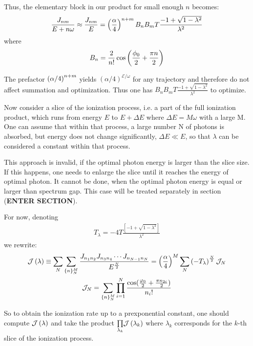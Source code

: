 Thus, the elementary block  in our product for small enough $ n $ becomes:
\begin{gather}
	\frac{J_{nm}}{E+n\omega}
	\approx
	\frac{J_{nm}}{E}
	=
	\left(\frac{\alpha}{4}\right)^{n+m}
	B_n B_m T
	\frac{-1+\sqrt{1-\lambda^2}}{\lambda^2}
\end{gather}
where
\begin{gather}
	B_n=
	\frac{2}{n!}\cos\left(\frac{\phi_0}{2}+\frac{\pi n}{2}\right)
\end{gather}

The prefactor $  \left(\alpha/4\right)^{n+m} $ yields $ (\alpha/4)^{\mathcal{E}/\omega} $ for any trajectory and therefore do not affect summation and optimization. Thus one has $ B_{n}B_{m}T\frac{-1+\sqrt{1-\lambda^{2}}}{\lambda^{2}} $ to optimize.

Now consider a slice of the ionization process, i.e. a part of the full ionization product, which runs from energy $ E $ to $ E+\Delta E $ where $ \Delta E=M\omega $ with a large M. One can assume that within that process, a large number N of photons is absorbed, but energy does not change significantly, $ \Delta E\ll E $, so that $ \lambda $ can be considered a constant within that process. 

This approach is invalid, if the optimal photon energy is larger  than the slice size. If this happens, one needs to enlarge the slice until it reaches the energy of optimal photon. It cannot be done, when the optimal photon energy is equal or larger than spectrum gap. This case will be treated separately in section (\textbf{ENTER SECTION}).

For now, denoting
\begin{gather}
\label{T_lambda_def}
	T_{\lambda}=-4T\frac{\left[-1+\sqrt{1-\lambda^{2}}\right]}{\lambda^{2}}
\end{gather}
we rewrite:
\begin{gather}
\label{ionization_super_formula_sum}
\mathcal{J}\left(\lambda\right)
\equiv
\sum_N
\sum_{\{n\}_{N}^{M}}\frac{	J_{n_1 n_{2}}
	J_{n_3 n_{4}}
	\cdots
	J_{n_{N-1}n_{N}}}{E^{\frac{N}{2}}}
=
\left(\frac{\alpha}{4}\right)^{M}
\sum_N
\left(-T_{\lambda}\right)^{\frac{N}{2}}
\mathcal{J}_N
\\
\label{ionization_super_formula}
\mathcal{J}_N
=
\sum_{\{n\}_{N}^{M}}\prod_{i=1}^{N}\frac{\cos(\frac{\varphi_{0}}{2}+\frac{\pi n_{2i}}{2})}{n_{i}!}
\end{gather}

So to obtain the ionization rate up to a prexponential constant, one should compute $ \mathcal{J}\left(\lambda\right) $ and take the product 
$ \underset{\lambda_k}{\prod} \mathcal{J}\left(\lambda_k\right)$ where $ \lambda_k $ corresponds for the $ k $-th slice of the ionization process.  
